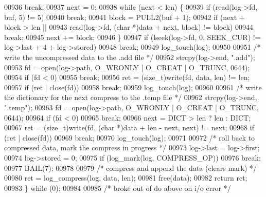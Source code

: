 \begin{DoxyCode}
{00936             \textcolor{keywordflow}{break};
00937         next = 0;
00938         \textcolor{keywordflow}{while} (next < len) \{
00939             \textcolor{keywordflow}{if} (read(log->fd, buf, 5) != 5)
00940                 \textcolor{keywordflow}{break};
00941             block = PULL2(buf + 1);
00942             \textcolor{keywordflow}{if} (next + block > len ||
00943                 read(log->fd, (\textcolor{keywordtype}{char} *)data + next, block) != block)
00944                 \textcolor{keywordflow}{break};
00945             next += block;
00946         \}
00947         \textcolor{keywordflow}{if} (lseek(log->fd, 0, SEEK\_CUR) != log->last + 4 + log->stored)
00948             \textcolor{keywordflow}{break};
00949         log\_touch(log);
00950 
00951         \textcolor{comment}{/* write the uncompressed data to the .add file */}
00952         strcpy(log->end, \textcolor{stringliteral}{".add"});
00953         fd = open(log->path, O\_WRONLY | O\_CREAT | O\_TRUNC, 0644);
00954         \textcolor{keywordflow}{if} (fd < 0)
00955             \textcolor{keywordflow}{break};
00956         ret = (size\_t)write(fd, data, len) != len;
00957         \textcolor{keywordflow}{if} (ret | close(fd))
00958             \textcolor{keywordflow}{break};
00959         log\_touch(log);
00960 
00961         \textcolor{comment}{/* write the dictionary for the next compress to the .temp file */}
00962         strcpy(log->end, \textcolor{stringliteral}{".temp"});
00963         fd = open(log->path, O\_WRONLY | O\_CREAT | O\_TRUNC, 0644);
00964         \textcolor{keywordflow}{if} (fd < 0)
00965             \textcolor{keywordflow}{break};
00966         next = DICT > len ? len : DICT;
00967         ret = (size\_t)write(fd, (\textcolor{keywordtype}{char} *)data + len - next, next) != next;
00968         \textcolor{keywordflow}{if} (ret | close(fd))
00969             \textcolor{keywordflow}{break};
00970         log\_touch(log);
00971 
00972         \textcolor{comment}{/* roll back to compressed data, mark the compress in progress */}
00973         log->last = log->first;
00974         log->stored = 0;
00975         \textcolor{keywordflow}{if} (log\_mark(log, COMPRESS\_OP))
00976             \textcolor{keywordflow}{break};
00977         BAIL(7);
00978 
00979         \textcolor{comment}{/* compress and append the data (clears mark) */}
00980         ret = log\_compress(log, data, len);
00981         free(data);
00982         \textcolor{keywordflow}{return} ret;
00983     \} \textcolor{keywordflow}{while} (0);
00984 
00985     \textcolor{comment}{/* broke out of do above on i/o error */}
}
\end{DoxyCode}
